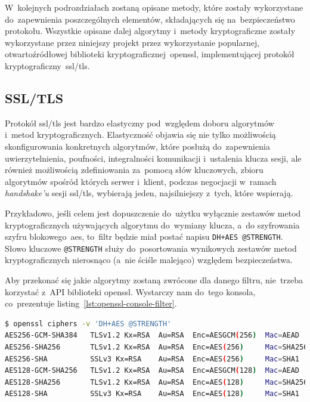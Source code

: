 \documentclass[thesis]{subfiles}
\begin{document}
W~kolejnych podrozdziałach zostaną opisane metody, które zostały wykorzystane do~zapewnienia poszczególnych elementów, składających się na~bezpieczeństwo protokołu. Wszystkie opisane dalej algorytmy i~metody kryptograficzne zostały wykorzystane przez niniejszy projekt przez wykorzystanie popularnej, otwartoźródłowej biblioteki kryptograficznej~\gls{openssl}, implementującej protokół kryptograficzny~\gls{ssl/tls}.


\subsection{SSL/TLS}
\label{subsec:ssl-tls}

Protokół \gls{ssl/tls} jest bardzo elastyczny pod~względem doboru algorytmów i~metod kryptograficznych. Elastyczność objawia się nie tylko możliwością skonfigurowania konkretnych algorytmów, które posłużą do~zapewnienia uwierzytelnienia, poufności, integralności komunikacji i~ustalenia klucza sesji, ale również możliwością zdefiniowania za~pomocą słów kluczowych, zbioru algorytmów spośród których serwer i~klient, podczas negocjacji w~ramach \emph{handshake'u} sesji \gls{ssl/tls}, wybierają jeden, najsilniejszy z~tych, które wspierają.

Przykładowo, jeśli celem jest dopuszczenie do~użytku wyłącznie zestawów metod kryptograficznych używających algorytmu  do~wymiany klucza, a~do szyfrowania szyfru blokowego~\gls{aes}, to~filtr będzie miał postać napisu \texttt{DH+AES @STRENGTH}. Słowo kluczowe \texttt{@STRENGTH} służy do~posortowania wynikowych zestawów metod kryptograficznych nierosnąco (a~nie ściśle malejąco) względem bezpieczeństwa.

Aby przekonać się jakie algorytmy zostaną zwrócone dla danego filtru, nie~trzeba korzystać z~API biblioteki \gls{openssl}. Wystarczy nam do~tego konsola, co~prezentuje listing~\ref{lst:openssl-console-filter}.\\

\begin{lstlisting}[numbers=none,language=bash,caption={Wynik filtrowania zestawów algorytmów w~konsoli za~pomocą \gls{openssl}},label=lst:openssl-console-filter]
$ openssl ciphers -v 'DH+AES @STRENGTH'
AES256-GCM-SHA384   TLSv1.2 Kx=RSA  Au=RSA  Enc=AESGCM(256)  Mac=AEAD
AES256-SHA256       TLSv1.2 Kx=RSA  Au=RSA  Enc=AES(256)     Mac=SHA256
AES256-SHA          SSLv3 Kx=RSA    Au=RSA  Enc=AES(256)     Mac=SHA1
AES128-GCM-SHA256   TLSv1.2 Kx=RSA  Au=RSA  Enc=AESGCM(128)  Mac=AEAD
AES128-SHA256       TLSv1.2 Kx=RSA  Au=RSA  Enc=AES(128)     Mac=SHA256
AES128-SHA          SSLv3 Kx=RSA    Au=RSA  Enc=AES(128)     Mac=SHA1
\end{lstlisting}
\end{document}
